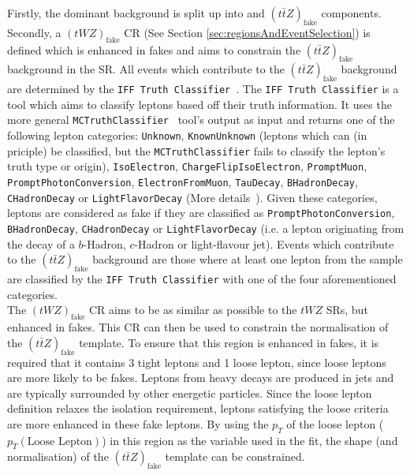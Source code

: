 Firstly, the dominant \ttZ background is split up into \ttZ and $(t\bar{t}Z)_{\text{fake}}$ components. Secondly, a $(tWZ)_{\text{fake}}$ CR (See Section \ref{sec:regionsAndEventSelection}) is defined which is enhanced in fakes and aims to constrain the $(t\bar{t}Z)_{\text{fake}}$ background in the SR. All events which contribute to the $(t\bar{t}Z)_{\text{fake}}$ background are determined by the \texttt{IFF Truth Classifier}~\cite{IFFTruthClassifier}. The \texttt{IFF Truth Classifier} is a tool which aims to classify leptons based off their truth information. It uses the more general \texttt{MCTruthClassifier}~\cite{MCTruthClassifier} tool's output as input and returns one of the following lepton categories: \texttt{Unknown}, \texttt{KnownUnknown} (leptons which can (in priciple) be classified, but the \texttt{MCTruthClassifier} fails to classify the lepton's truth type or origin), \texttt{IsoElectron}, \texttt{ChargeFlipIsoElectron}, \texttt{PromptMuon}, \texttt{PromptPhotonConversion}, \texttt{ElectronFromMuon}, \texttt{TauDecay}, \texttt{BHadronDecay}, \texttt{CHadronDecay} or \texttt{LightFlavorDecay} (More details~\cite{IFFTruthClassifier-leptonCategories}). Given these categories, leptons are considered as fake if they are classified as \texttt{PromptPhotonConversion}, \texttt{BHadronDecay}, \texttt{CHadronDecay} or \texttt{LightFlavorDecay} (i.e. a lepton originating from the decay of a $b$-Hadron, $c$-Hadron or light-flavour jet). Events which contribute to the $(t\bar{t}Z)_{\text{fake}}$ background are those where at least one lepton from the \ttZ sample are classified by the \texttt{IFF Truth Classifier} with one of the four aforementioned categories.\\

The $(tWZ)_{\text{fake}}$ CR aims to be as similar as possible to the $tWZ$ SRs, but enhanced in fakes. This CR can then be used to constrain the normalisation of the $(t\bar{t}Z)_{\text{fake}}$ template. To ensure that this region is enhanced in fakes, it is required that it contains 3 tight leptons and 1 loose lepton, since loose leptons are more likely to be fakes. Leptons from heavy decays are produced in jets and are typically surrounded by other energetic particles. Since the loose lepton definition relaxes the isolation requirement, leptons satisfying the loose criteria are more enhanced in these fake leptons. By using the $p_{T}$ of the loose lepton ($p_{T}(\text{Loose Lepton})$) in this region as the variable used in the fit, the shape (and normalisation) of the $(t\bar{t}Z)_{\text{fake}}$ template can be constrained.\\


